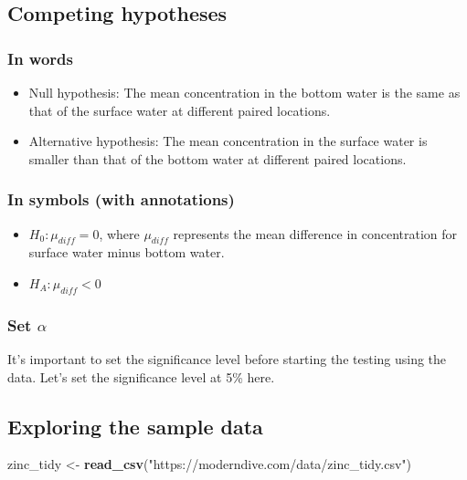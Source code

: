 \documentclass[12pt,]{krantz}
\makeatletter
\newenvironment{Shaded}{\begin{snugshade}}{\end{snugshade}}
\newcommand{\KeywordTok}[1]{\textcolor[rgb]{0.27,0.27,0.27}{\textbf{#1}}}
\newcommand{\StringTok}[1]{\textcolor[rgb]{0.5,0.5,0.5}{#1}}
\newcommand{\NormalTok}[1]{#1}
\providecommand{\tightlist}{%
  \setlength{\itemsep}{0pt}\setlength{\parskip}{0pt}}
\newenvironment{kframe}{%
\medskip{}
\setlength{\fboxsep}{.8em}
 \def\at@end@of@kframe{}%
 \ifinner\ifhmode%
  \def\at@end@of@kframe{\end{minipage}}%
  \begin{minipage}{\columnwidth}%
 \fi\fi%
 \def\FrameCommand##1{\hskip\@totalleftmargin \hskip-\fboxsep
 \colorbox{shadecolor}{##1}\hskip-\fboxsep
     \hskip-\linewidth \hskip-\@totalleftmargin \hskip\columnwidth}%
 \MakeFramed {\advance\hsize-\width
   \@totalleftmargin\z@ \linewidth\hsize
   \@setminipage}}%
 {\par\unskip\endMakeFramed%
 \at@end@of@kframe}
\renewenvironment{Shaded}{\begin{kframe}}{\end{kframe}}
\theoremstyle{definition}
\theoremstyle{definition}
\theoremstyle{definition}
\theoremstyle{remark}
\makeatother
\begin{document}
\subsection{Competing hypotheses}\label{competing-hypotheses-4}

\subsubsection*{In words}\label{in-words-4}


\begin{itemize}
\item
  Null hypothesis: The mean concentration in the bottom water is the
  same as that of the surface water at different paired locations.
\item
  Alternative hypothesis: The mean concentration in the surface water is
  smaller than that of the bottom water at different paired locations.
\end{itemize}

\subsubsection*{In symbols (with
annotations)}\label{in-symbols-with-annotations-4}


\begin{itemize}
\tightlist
\item
  \(H_0: \mu_{diff} = 0\), where \(\mu_{diff}\) represents the mean
  difference in concentration for surface water minus bottom water.
\item
  \(H_A: \mu_{diff} < 0\)
\end{itemize}

\subsubsection*{\texorpdfstring{Set
\(\alpha\)}{Set \textbackslash{}alpha}}\label{set-alpha-4}


It's important to set the significance level before starting the testing
using the data. Let's set the significance level at 5\% here.

\subsection{Exploring the sample
data}\label{exploring-the-sample-data-4}

\begin{Shaded}
\begin{Highlighting}[]
\NormalTok{zinc_tidy <-}\StringTok{ }\KeywordTok{read_csv}\NormalTok{(}\StringTok{"https://moderndive.com/data/zinc_tidy.csv"}\NormalTok{)}
\end{Highlighting}
\end{Shaded}
\end{document}
